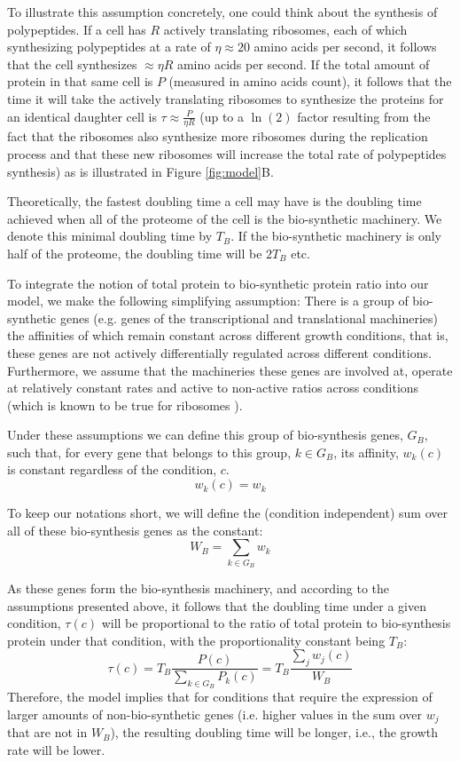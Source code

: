 \documentclass[a4paper]{article}
\begin{document}
To illustrate this assumption concretely, one could think about the synthesis of polypeptides.
If a cell has $R$ actively translating ribosomes, each of which synthesizing polypeptides at a rate of $\eta \approx 20$ amino acids per second, it follows that the cell synthesizes $\approx \eta R$ amino acids per second.
If the total amount of protein in that same cell is $P$ (measured in amino acids count), it follows that the time it will take the actively translating ribosomes to synthesize the proteins for an identical daughter cell is $\tau \approx \frac{P}{\eta R}$ (up to a $\ln(2)$ factor resulting from the fact that the ribosomes also synthesize more ribosomes during the replication process and that these new ribosomes will increase the total rate of polypeptides synthesis) as is illustrated in Figure \ref{fig:model}B.


Theoretically, the fastest doubling time a cell may have is the doubling time achieved when all of the proteome of the cell is the bio-synthetic machinery.
We denote this minimal doubling time by $T_B$.
If the bio-synthetic machinery is only half of the proteome, the doubling time will be $2T_B$ etc.

To integrate the notion of total protein to bio-synthetic protein ratio into our model, we make the following simplifying assumption:
There is a group of bio-synthetic genes (e.g. genes of the transcriptional and translational machineries) the affinities of which remain constant across different growth conditions, that is, these genes are not actively differentially regulated across different conditions.
Furthermore, we assume that the machineries these genes are involved at, operate at relatively constant rates and active to non-active ratios across conditions (which is known to be true for ribosomes \cite{Bremer1987}).

Under these assumptions we can define this group of bio-synthesis genes, $G_B$, such that, for every gene that belongs to this group, $k \in G_B$, its affinity, $w_k(c)$ is constant regardless of the condition, $c$.
\begin{equation}
  \label{eq:biosynth-def}
  w_k(c)=w_k
\end{equation}

To keep our notations short, we will define the (condition independent) sum over all of these bio-synthesis genes as the constant:
\[
W_B = \sum_{k\in G_B}w_k
\]

As these genes form the bio-synthesis machinery, and according to the assumptions presented above, it follows that the doubling time under a given condition, $\tau(c)$ will be proportional to the ratio of total protein to bio-synthesis protein under that condition, with the proportionality constant being $T_B$:
\begin{equation}
  \label{eq:gr-ratio}
  \tau(c) = T_B\frac{P(c)}{\sum_{k\in G_B}P_k(c)}=T_B\frac{\sum_jw_j(c)}{W_B}
\end{equation}
Therefore, the model implies that for conditions that require the expression of larger amounts of non-bio-synthetic genes (i.e. higher values in the sum over $w_j$ that are not in $W_B$), the resulting doubling time will be longer, i.e., the growth rate will be lower.
\end{document}

